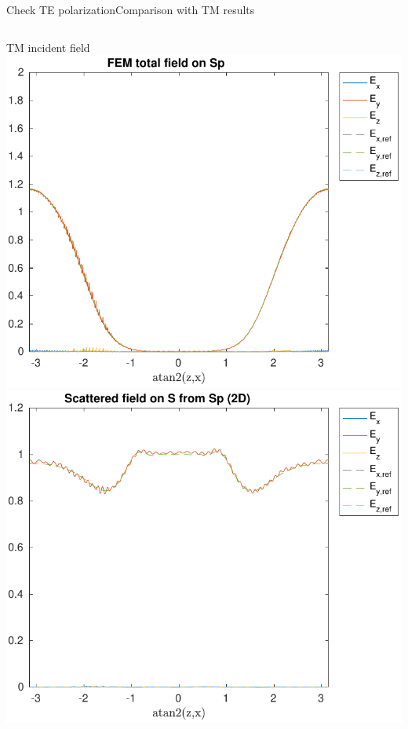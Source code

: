 \begin{frame}[allowframebreaks]{Check TE polarization}{Comparison
      with TM results}
\begin{columns}
    \end{columns}
    
    \framebreak
    
    \begin{columns}
      \hfill TM incident field \hfill\mbox{}
      \vspace{1ex}
      \includegraphics[width=\linewidth]{results/TM/E_Sp.pdf}
      \includegraphics[width=\linewidth]{results/TM/E_S.pdf}
      

\end{columns}
\end{frame}

